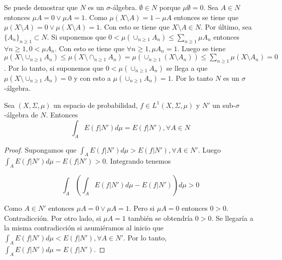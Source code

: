 Se puede demostrar que $N$ es un $\sigma$-álgebra. $\emptyset \in N$ porque $\mu \emptyset = 0$. Sea $A \in N$ entonces $\mu A = 0 \vee \mu A = 1$. Como $\mu(X \setminus A) = 1 - \mu A$ entonces se tiene que $\mu(X \setminus A) = 0 \vee \mu(X \setminus A) = 1$. Con esto se tiene que $X \setminus A \in N$. Por último, sea $\{A_n\}_{n \geq 1} \subset N$.  Si suponemos que $0 < \mu(\cup_{n \geq 1} A_n) \leq \sum_{n \geq 1} \mu A_n$ entonces $\forall n \geq 1, 0 < \mu A_n$. Con esto se tiene que $\forall n \geq 1, \mu A_n = 1$. Luego se tiene $\mu(X \setminus \cup_{n \geq 1} A_n) \leq \mu(X \setminus \cap_{n \geq 1} A_n) = \mu(\cup_{n \geq 1} (X \setminus A_n)) \leq \sum_{n \geq 1} \mu(X \setminus A_n) = 0$. Por lo tanto, si suponemos que $0 < \mu(\cup_{n \geq 1} A_n)$  se llega a que $\mu(X \setminus \cup_{n \geq 1} A_n) = 0$ y con esto a $\mu(\cup_{n \geq 1} A_n) = 1$. Por lo tanto $N$ es un $\sigma$-álgebra.

\begin{propiedad}\label{esperanza_en_sigma-algebra_trivial}
	Sea $(X,\Sigma,\mu)$ un espacio de probabilidad, $f \in L^1(X,\Sigma,\mu)$ y $N'$ un sub-$\sigma$-álgebra de $N$. Entonces	
	\begin{equation}
	\int_A E(f|N') d\mu = E(f|N'), \forall A \in N
	\end{equation}
\end{propiedad}

\begin{proof}
	Supongamos que $\int_A E(f|N') d\mu > E(f|N'), \forall A \in N'$. Luego $\int_A E(f|N') d\mu - E(f|N') > 0$. Integrando tenemos
	
	\begin{equation}
	\int_A \left( \int_A E(f|N')d\mu - E(f|N') \right) d\mu > 0
	\end{equation}
	
	Como $A \in N'$ entonces $\mu A = 0 \vee \mu A = 1$. Pero si $\mu A = 0$ entonces $0>0$. Contradicción. Por otro lado, si $\mu A = 1$ también se obtendría $0>0$. Se llegaría a la misma contradicción si asumiéramos al inicio que $\int_A E(f|N') d\mu < E(f|N'), \forall A \in N'$. Por lo tanto, $\int_A E(f|N') d\mu = E(f|N')$.
\end{proof}